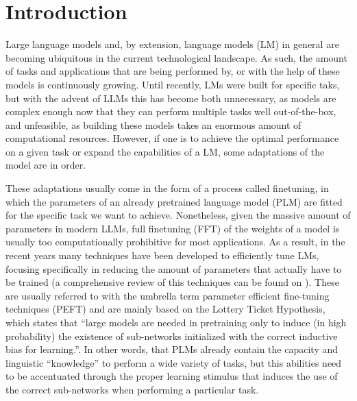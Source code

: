 \documentclass[fleqn,moreauthors,10pt]{ds_report}
\affiliation{\textit{Advisors: Slavko Žitnik}}
\begin{document}
\flushbottom 

\maketitle 

\thispagestyle{empty} 


\section*{Introduction}

    Large language models and, by extension, language models (LM) in general are becoming ubiquitous in the current technological landscape. As such, the amount of tasks and applications that are being performed by, or with the help of these models is continuously growing. Until recently, LMs were built for specific taks, but with the advent of LLMs this has become both unnecessary, as models are complex enough now that they can perform multiple tasks well out-of-the-box, and unfeasible, as building these models takes an enormous amount of computational resources. However, if one is to achieve the optimal performance on a given task or expand the capabilities of a LM, some adaptations of the model are in order.
    
    These adaptations usually come in the form of a process called finetuning, in which the parameters of an already pretrained language model (PLM) are fitted for the specific task we want to achieve. Nonetheless, given the massive amount of parameters in modern LLMs, full finetuning (FFT) of the weights of a model is usually too computationally prohibitive for most applications. As a result, in the recent years many techniques have been developed to efficiently tune LMs, focusing specifically in reducing the amount of parameters that actually have to be trained (a comprehensive review of this techniques can be found on \cite{survey}). These are usually referred to with the umbrella term parameter efficient fine-tuning techniques (PEFT) and are mainly based on the Lottery Ticket Hypothesis, which states that ``large models are needed in pretraining only to induce (in high probability) the existence of sub-networks initialized with the correct inductive bias for learning.''. In other words, that PLMs already contain the capacity and linguistic ``knowledge'' to perform a wide variety of tasks, but this abilities need to be accentuated through the proper learning stimulus that induces the use of the correct sub-networks when performing a particular task. 
\end{document}
